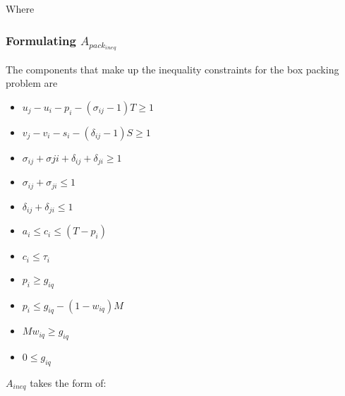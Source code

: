 \documentclass[conference]{IEEEtran}
\begin{document}
Where

\subsubsection{Formulating $A_{pack_{ineq}}$}
The components that make up the inequality constraints for the box
packing problem are

\begin{itemize}
\item
  \(u_j - u_i - p_i - (\sigma_{ij} - 1)T \geq 1\)
\item
  \(v_j - v_i - s_i - (\delta_{ij} - 1)S \geq 1\)
\item
  \(\sigma_{ij} + \sigma{ji} + \delta_{ij} + \delta_{ji} \geq 1\)
\item
  \(\sigma_{ij} + \sigma_{ji} \leq 1\)
\item
  \(\delta_{ij} + \delta_{ji} \leq 1\)
\item
  \(a_i \leq c_i \leq (T - p_i)\)
\item
  \(c_i \leq \tau_i\)
\item
  \(p_i \geq g_{iq}\)
\item
  \(p_i \leq g_{iq} - (1 - w_{iq})M\)
\item
  \(Mw_{iq} \geq g_{iq}\)
\item
  \(0 \leq g_{iq}\)
\end{itemize}

\(A_{ineq}\) takes the form of:

\scriptsize
\end{document}
